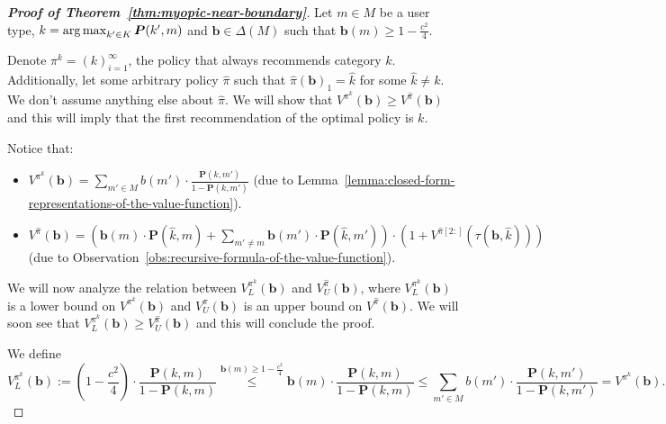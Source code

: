 \begin{proof}[\normalfont\bfseries Proof of Theorem~\ref{thm:myopic-near-boundary}]
    Let $m \in M$ be a user type, $k = \operatorname*{arg\,max}_{k' \in K} \bm{P}(k', m)$ and $\bm{b} \in \Delta(M)$ such that $\bm b(m) \geq 1 - \frac{c^2}{4}$.

    Denote $\pi^{k} = \left( k \right)_{i=1}^{\infty}$, the policy that always recommends category $k$. Additionally, let some arbitrary policy $\hat{\pi}$ such that $\hat{\pi}(\bm{b})_1 = \hat{k}$ for some $\hat{k} \neq k$. We don't assume anything else about $\hat{\pi}$. We will show that $V^{\pi^k}(\bm{b}) \geq V^{\hat{\pi}}(\bm{b})$ and this will imply that the first recommendation of the optimal policy is $k$.

    Notice that:
    \begin{itemize}
        \item $V^{\pi^k}(\bm{b}) = \sum_{m' \in M} b(m') \cdot \frac{\bm{P}(k, m')}{1 - \bm{P}(k, m')}$ \hfill (due to Lemma~\ref{lemma:closed-form-representations-of-the-value-function}).
        \item $V^{\hat{\pi}}(\bm{b}) = \left( \bm b(m) \cdot \bm{P}(\hat{k}, m) + \sum_{m' \neq m} \bm b(m') \cdot \bm{P}(\hat{k}, m') \right) \cdot \left( 1 + V^{\hat{\pi}[2:]}(\tau(\bm{b}, \hat{k})) \right)$ \hfill (due to Observation~\ref{obs:recursive-formula-of-the-value-function}).
    \end{itemize}
    We will now analyze the relation between $V^{\pi^k}_{L}(\bm{b})$ and $V^{\hat{\pi}}_{U}(\bm{b})$, where $V^{\pi^k}_{L}(\bm{b})$ is a lower bound on $V^{\pi^k}(\bm{b})$ and $V^{\hat{\pi}}_{U}(\bm{b})$ is an upper bound on $V^{\hat{\pi}}(\bm{b})$. We will soon see that $V^{\pi^k}_{L}(\bm{b}) \geq V^{\hat{\pi}}_{U}(\bm{b})$ and this will conclude the proof.

    We define
    \[
        V^{\pi^k}_{L}(\bm{b}) := \left( 1 - \frac{c^2}{4} \right) \cdot \frac{\bm{P}(k, m)}{1 - \bm{P}(k, m)} \overset{\bm b(m) \geq 1 - \frac{c^2}{4}}{\leq} \bm b(m) \cdot \frac{\bm{P}(k, m)}{1 - \bm{P}(k, m)} \leq \sum_{m' \in M} b(m') \cdot \frac{\bm{P}(k, m')}{1 - \bm{P}(k, m')} = V^{\pi^k}(\bm{b}).
    \]


\end{proof}
